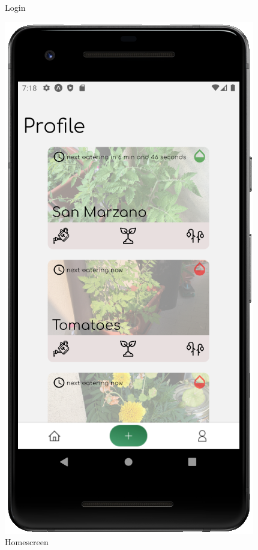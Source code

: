 \documentclass[10pt]{article}
\begin{document}
\begin{figure}[h]
\begin{minipage}[h]{0.4\textwidth}
         \caption{Login}
         \label{fig:screen1}
     \end{minipage}%
     \hfill
     \begin{minipage}[h]{0.4\textwidth}
         \centering
         \includegraphics[width=\textwidth]{resources/screens/Homescreen.PNG}
         \caption{Homescreen}
         \label{fig:screen2}
     \end{minipage}
    \end{figure}
    
\end{document}
